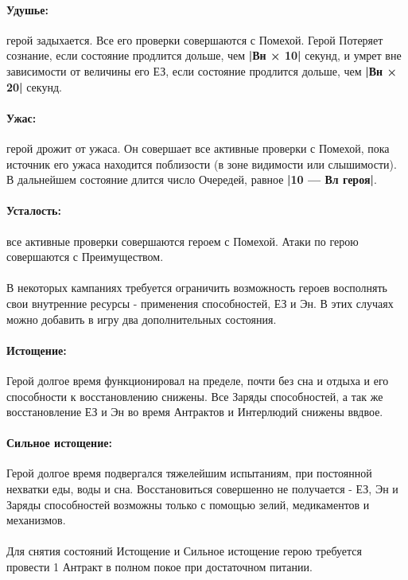 \paragraph{Удушье:} герой задыхается. Все его проверки совершаются с Помехой. Герой Потеряет сознание, если состояние продлится дольше, чем \textbf{|Вн × 10|} секунд, и умрет вне зависимости от величины его ЕЗ, если состояние продлится дольше, чем \textbf{|Вн × 20|} секунд.
\paragraph{Ужас:} герой дрожит от ужаса. Он совершает все активные проверки с Помехой, пока источник его ужаса находится поблизости (в зоне видимости или слышимости). В дальнейшем состояние длится число Очередей, равное \textbf{|10 — Вл героя|}.
\paragraph{Усталость:} все активные проверки совершаются героем с Помехой. Атаки по герою совершаются с Преимуществом.
\begin{tcolorbox}
\paragraph{} В некоторых кампаниях требуется ограничить возможность героев восполнять свои внутренние ресурсы - применения способностей, ЕЗ и Эн. В этих случаях можно добавить в игру два дополнительных состояния.
\paragraph{Истощение:} Герой долгое время функционировал на пределе, почти без сна и отдыха и его способности к восстановлению снижены. Все Заряды способностей, а так же восстановление ЕЗ и Эн во время Антрактов и Интерлюдий снижены ввдвое.
\paragraph{Сильное истощение:} Герой долгое время подвергался тяжелейшим испытаниям, при постоянной нехватки еды, воды и сна. Восстановиться совершенно не получается - ЕЗ, Эн и Заряды способностей возможны только с помощью зелий, медикаментов и механизмов.
\paragraph{} Для снятия состояний Истощение и Сильное истощение герою требуется провести 1 Антракт в полном покое при достаточном питании.
\end{tcolorbox}
